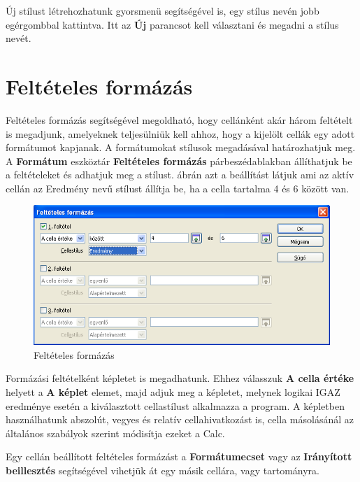 Új stílust létrehozhatunk gyorsmenü segítségével is, egy
stílus nevén jobb egérgombbal kattintva. Itt az \textbf{Új}
parancsot kell választani és megadni a stílus nevét.


\section{Feltételes formázás}

Feltételes formázás segítségével megoldható, hogy
cellánként akár három feltételt is megadjunk, amelyeknek
teljesülniük kell ahhoz, hogy a kijelölt cellák egy adott
formátumot kapjanak. A formátumokat stílusok megadásával
határozhatjuk meg. A \textbf{Formátum} eszköztár
\textbf{Feltételes formázás} párbeszédablakban
állíthatjuk be a feltételeket és adhatjuk meg a stílust. 
 ábrán azt a beállítást látjuk ami az aktív cellán
az Eredmény nevű stílust állítja be, ha a cella tartalma 4
és 6 között van.

\begin{figure}[!h]
\begin{center}
\includegraphics[width=15.999cm]{oocalcv1-img159.png}
\caption{Feltételes formázás}\label{FeltételesFormázás}
\end{center}
\end{figure}

Formázási feltételként képletet is megadhatunk. Ehhez
válasszuk \textbf{A cella értéke} helyett a \textbf{A képlet
}elemet, majd adjuk meg a képletet, melynek logikai IGAZ eredménye
esetén a kiválasztott cellastílust alkalmazza a program. A
képletben használhatunk abszolút, vegyes és relatív
cellahivatkozást is, cella másolásánál az általános
szabályok szerint módisítja ezeket a Calc.

Egy cellán beállított feltételes formázást a
\textbf{Formátumecset} vagy az \textbf{Irányított beillesztés}
segítségével vihetjük át egy másik cellára, vagy
tartományra.


